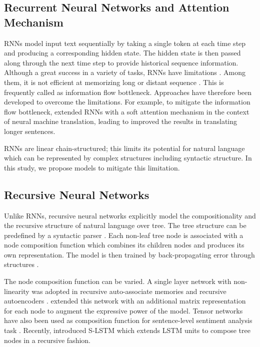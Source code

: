 \documentclass[11pt]{article}
\begin{document}
\subsection{Recurrent Neural Networks and Attention Mechanism}
RNNs model input text sequentially by taking a single token at each time step and producing a corresponding hidden state. The hidden state is then passed along through the next time step to provide historical sequence information. Although a great success in a variety of tasks, RNNs have limitations \cite{bengio:94,hochreiter:98}. Among them, it is not efficient at memorizing long or distant sequence \cite{sutskever:14}. This is frequently called as information flow bottleneck.
Approaches have therefore been developed to overcome the limitations. 
For example, to mitigate the information flow bottleneck,  extended RNNs with a soft attention mechanism in the context of neural machine translation, leading to improved the results in translating longer sentences. 


RNNs are linear chain-structured; this limits its potential for natural language which can be represented by complex structures including syntactic structure. In this study, we propose models to mitigate this limitation. 





\subsection{Recursive Neural Networks}

Unlike RNNs, recursive neural networks explicitly model the compositionality and the recursive structure of natural language over tree. The tree structure can be predefined by a syntactic parser \cite{socher2013recursive}. Each non-leaf tree node is associated with a node composition function which combines its children nodes and produces its own representation. The model is then trained by back-propagating error through structures \cite{goller1996learning}.

The node composition function can be varied. A single layer network with  non-linearity was adopted in recursive auto-associate memories \cite{pollack1990recursive} and recursive autoencoders \cite{socher2011semi}.  extended this network with an additional matrix representation for each node to augment the expressive power of the model. Tensor networks have also been used as composition function for sentence-level sentiment analysis task \cite{socher2013recursive}. Recently,  introduced S-LSTM which extends LSTM units to compose tree nodes in a recursive fashion. 
\end{document}
